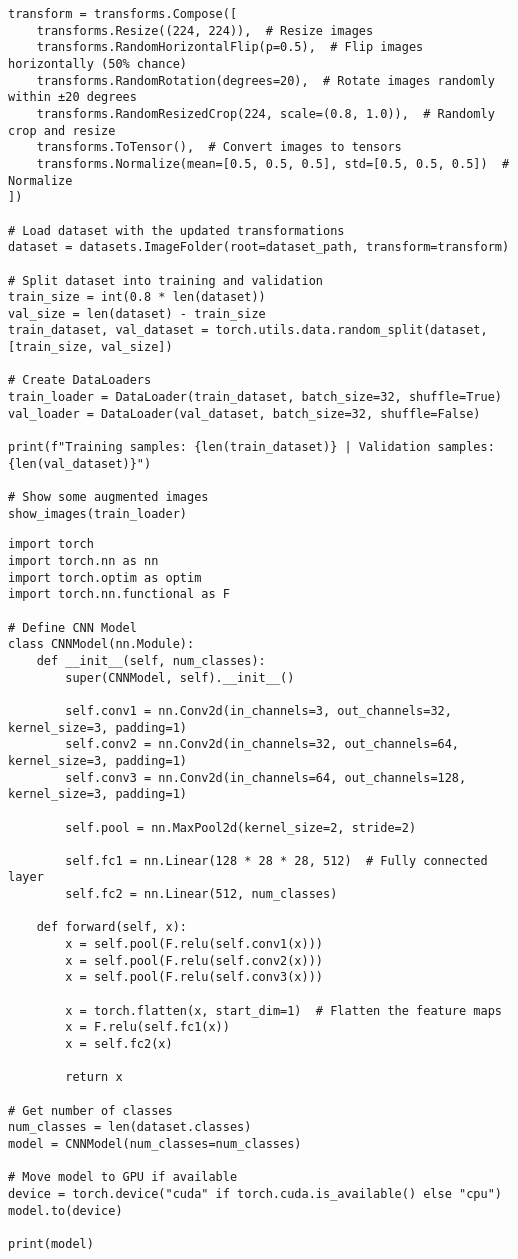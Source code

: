 \documentclass{article}
\begin{document}
\begin{verbatim}
transform = transforms.Compose([
    transforms.Resize((224, 224)),  # Resize images
    transforms.RandomHorizontalFlip(p=0.5),  # Flip images horizontally (50% chance)
    transforms.RandomRotation(degrees=20),  # Rotate images randomly within ±20 degrees
    transforms.RandomResizedCrop(224, scale=(0.8, 1.0)),  # Randomly crop and resize
    transforms.ToTensor(),  # Convert images to tensors
    transforms.Normalize(mean=[0.5, 0.5, 0.5], std=[0.5, 0.5, 0.5])  # Normalize
])

# Load dataset with the updated transformations
dataset = datasets.ImageFolder(root=dataset_path, transform=transform)

# Split dataset into training and validation
train_size = int(0.8 * len(dataset))
val_size = len(dataset) - train_size
train_dataset, val_dataset = torch.utils.data.random_split(dataset, [train_size, val_size])

# Create DataLoaders
train_loader = DataLoader(train_dataset, batch_size=32, shuffle=True)
val_loader = DataLoader(val_dataset, batch_size=32, shuffle=False)

print(f"Training samples: {len(train_dataset)} | Validation samples: {len(val_dataset)}")

# Show some augmented images
show_images(train_loader)

\end{verbatim}

\begin{verbatim}
import torch
import torch.nn as nn
import torch.optim as optim
import torch.nn.functional as F

# Define CNN Model
class CNNModel(nn.Module):
    def __init__(self, num_classes):
        super(CNNModel, self).__init__()

        self.conv1 = nn.Conv2d(in_channels=3, out_channels=32, kernel_size=3, padding=1)
        self.conv2 = nn.Conv2d(in_channels=32, out_channels=64, kernel_size=3, padding=1)
        self.conv3 = nn.Conv2d(in_channels=64, out_channels=128, kernel_size=3, padding=1)

        self.pool = nn.MaxPool2d(kernel_size=2, stride=2)

        self.fc1 = nn.Linear(128 * 28 * 28, 512)  # Fully connected layer
        self.fc2 = nn.Linear(512, num_classes)

    def forward(self, x):
        x = self.pool(F.relu(self.conv1(x)))
        x = self.pool(F.relu(self.conv2(x)))
        x = self.pool(F.relu(self.conv3(x)))

        x = torch.flatten(x, start_dim=1)  # Flatten the feature maps
        x = F.relu(self.fc1(x))
        x = self.fc2(x)

        return x

# Get number of classes
num_classes = len(dataset.classes)
model = CNNModel(num_classes=num_classes)

# Move model to GPU if available
device = torch.device("cuda" if torch.cuda.is_available() else "cpu")
model.to(device)

print(model)

\end{verbatim}
\end{document}
